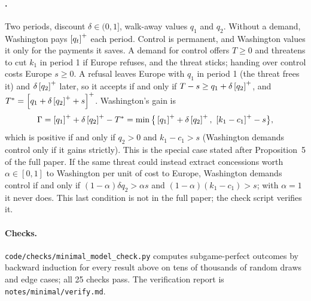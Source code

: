 \documentclass[11pt]{article}
\begin{document}
\paragraph{.} Two periods, discount $\delta\in(0,1]$, walk-away values $q_1$ and $q_2$. Without a demand, Washington pays $\left[q_t\right]^{+}$ each period. Control is permanent, and Washington values it only for the payments it saves. A demand for control offers $T\ge 0$ and threatens to cut $k_1$ in period 1 if Europe refuses, and the threat sticks; handing over control costs Europe $s\ge 0$. A refusal leaves Europe with $q_1$ in period 1 (the threat frees it) and $\delta\left[q_2\right]^{+}$ later, so it accepts if and only if $T-s\ge q_1+\delta\left[q_2\right]^{+}$, and $T^*=\left[q_1+\delta\left[q_2\right]^{+}+s\right]^{+}$. Washington's gain is
\[
\Gamma=\pos{q_1}+\delta\pos{q_2}-T^*=\min\big\{\pos{q_1}+\delta\pos{q_2},\ \pos{k_1-c_1}-s\big\},
\]
which is positive if and only if $q_2>0$ and $k_1-c_1>s$ (Washington demands control only if it gains strictly). This is the special case stated after Proposition~5 of the full paper. If the same threat could instead extract concessions worth $\alpha\in[0,1]$ to Washington per unit of cost to Europe, Washington demands control if and only if $(1-\alpha)\delta q_2>\alpha s$ and $(1-\alpha)(k_1-c_1)>s$; with $\alpha=1$ it never does. This last condition is not in the full paper; the check script verifies it.

\paragraph{Checks.} \texttt{code/checks/minimal\_model\_check.py} computes subgame-perfect outcomes by backward induction for every result above on tens of thousands of random draws and edge cases; all 25 checks pass. The verification report is \texttt{notes/minimal/verify.md}.
\end{document}

